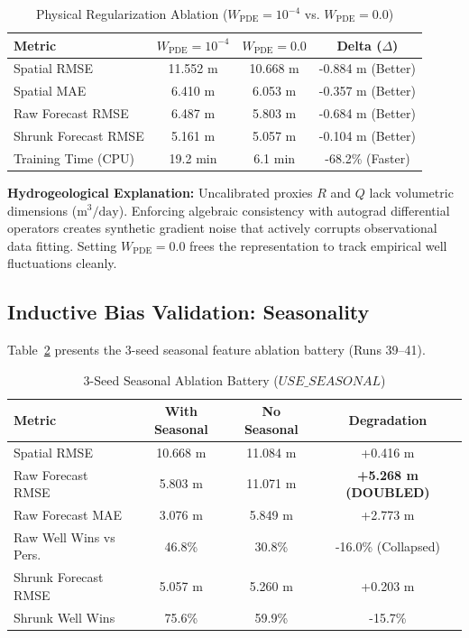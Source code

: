 \documentclass[10pt,conference,letterpaper]{IEEEtran}
\begin{document}
\begin{table}[h]
\centering
\caption{Physical Regularization Ablation ($W_{\text{PDE}} = 10^{-4}$ vs. $W_{\text{PDE}} = 0.0$)}
\label{tab:pde_ablation}
\begin{tabular}{lccc}
\toprule
\textbf{Metric} & \textbf{$W_{\text{PDE}} = 10^{-4}$} & \textbf{$W_{\text{PDE}} = 0.0$} & \textbf{Delta ($\Delta$)} \\
\midrule
Spatial RMSE & 11.552 m & 10.668 m & -0.884 m (Better) \\
Spatial MAE & 6.410 m & 6.053 m & -0.357 m (Better) \\
Raw Forecast RMSE & 6.487 m & 5.803 m & -0.684 m (Better) \\
Shrunk Forecast RMSE & 5.161 m & 5.057 m & -0.104 m (Better) \\
Training Time (CPU) & 19.2 min & 6.1 min & -68.2\% (Faster) \\
\bottomrule
\end{tabular}
\end{table}

\textbf{Hydrogeological Explanation:} Uncalibrated proxies $R$ and $Q$ lack volumetric dimensions ($\text{m}^3/\text{day}$). Enforcing algebraic consistency with autograd differential operators creates synthetic gradient noise that actively corrupts observational data fitting. Setting $W_{\text{PDE}} = 0.0$ frees the representation to track empirical well fluctuations cleanly.

\subsection{Inductive Bias Validation: Seasonality}
Table~\ref{tab:seasonal_ablation} presents the 3-seed seasonal feature ablation battery (Runs 39--41).

\begin{table}[h]
\centering
\caption{3-Seed Seasonal Ablation Battery ($USE\_SEASONAL$)}
\label{tab:seasonal_ablation}
\begin{tabular}{lccc}
\toprule
\textbf{Metric} & \textbf{With Seasonal} & \textbf{No Seasonal} & \textbf{Degradation} \\
\midrule
Spatial RMSE & 10.668 m & 11.084 m & +0.416 m \\
Raw Forecast RMSE & 5.803 m & 11.071 m & \textbf{+5.268 m (DOUBLED)} \\
Raw Forecast MAE & 3.076 m & 5.849 m & +2.773 m \\
Raw Well Wins vs Pers. & 46.8\% & 30.8\% & -16.0\% (Collapsed) \\
Shrunk Forecast RMSE & 5.057 m & 5.260 m & +0.203 m \\
Shrunk Well Wins & 75.6\% & 59.9\% & -15.7\% \\
\bottomrule
\end{tabular}
\end{table}
\end{document}
